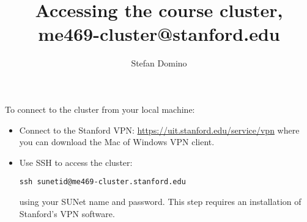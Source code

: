 \documentclass[letterpaper, 11pt]{article}
\title{\vspace{-1.5cm}\textbf{Accessing the course cluster, me469-cluster@stanford.edu}}
\author{Stefan Domino}
\begin{document}
\maketitle
\thispagestyle{fancy}

\noindent
To connect to the cluster from your local machine:
\begin{itemize}[noitemsep]
  \item Connect to the Stanford VPN: \url{https://uit.stanford.edu/service/vpn} where you can download the Mac of Windows VPN client.
  \item Use SSH to access the cluster: 

      \begin{center}
      \texttt{ssh sunetid@me469-cluster.stanford.edu}
      \end{center}

      using your SUNet name and password. This step requires an installation of Stanford's VPN software.
\end{itemize}
\end{document}
